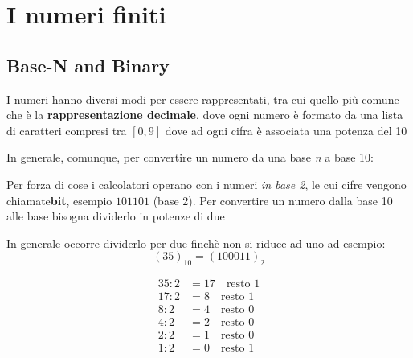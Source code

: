 \chapter{I numeri finiti}
\section{Base-N and Binary}

I numeri hanno diversi modi per essere rappresentati, tra cui quello più comune che è la \textbf{rappresentazione decimale}, dove ogni numero è formato da una lista di caratteri compresi tra $[0,9]$ dove ad ogni cifra è associata una potenza del 10
\\

In generale, comunque, per convertire un numero da una base \textit{n} a base 10:

Per forza di cose i calcolatori operano con i numeri \textit{in base 2}, le cui cifre vengono chiamate\textbf{bit}, esempio $101101$ (base 2).
Per convertire un numero dalla base 10 alle base bisogna dividerlo in potenze di due 
\esempio{
    \[
        37 \, (\text{base } 10) = 32 + 4 + 1 = 1 \cdot 2^5 + 0 \cdot 2^4 + 0 \cdot 2^3 + 1 \cdot 2^2 + 0 \cdot 2^1 + 1 \cdot 2^0 = 100101 \, (\text{base } 2)
    \]
}

In generale occorre dividerlo per due finchè non si riduce ad uno ad esempio: 
\[
(35)_{10} = (100011)_2
\]

\begin{align*}
    35 : 2 &= 17 \quad \text{resto } 1 \\
    17 : 2 &= 8  \quad \text{resto } 1 \\
    8 : 2  &= 4  \quad \text{resto } 0 \\
    4 : 2  &= 2  \quad \text{resto } 0 \\
    2 : 2  &= 1  \quad \text{resto } 0 \\
    1 : 2  &= 0  \quad \text{resto } 1
    \end{align*}
    


